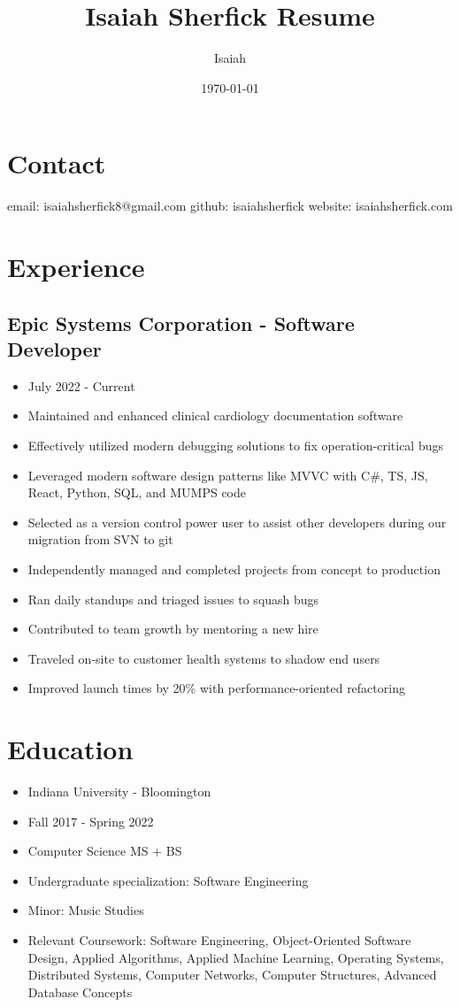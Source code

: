 \documentclass[11pt]{article}
\author{Isaiah}
\date{\today}
\title{Isaiah Sherfick Resume}
\begin{document}
\maketitle
\tableofcontents

\section{Contact}
\label{sec:org80c39f9}
email: isaiahsherfick8@gmail.com
github: isaiahsherfick
website: isaiahsherfick.com
\section{Experience}
\label{sec:org1af89ef}
\subsection{Epic Systems Corporation - Software Developer}
\label{sec:org43a5bc1}
\begin{itemize}
\item July 2022 - Current
\item Maintained and enhanced clinical cardiology documentation software
\item Effectively utilized modern debugging solutions to fix operation-critical bugs
\item Leveraged modern software design patterns like MVVC with C\#, TS, JS, React, Python, SQL, and MUMPS code
\item Selected as a version control power user to assist other developers during our migration from SVN to git
\item Independently managed and completed projects from concept to production
\item Ran daily standups and triaged issues to squash bugs
\item Contributed to team growth by mentoring a new hire
\item Traveled on-site to customer health systems to shadow end users
\item Improved launch times by 20\% with performance-oriented refactoring
\end{itemize}
\section{Education}
\label{sec:orga08435d}
\begin{itemize}
\item Indiana University - Bloomington
\item Fall 2017 - Spring 2022
\item Computer Science MS + BS
\item Undergraduate specialization: Software Engineering
\item Minor: Music Studies
\item Relevant Coursework: Software Engineering, Object-Oriented Software Design, Applied Algorithms, Applied Machine Learning, Operating Systems, Distributed Systems, Computer Networks, Computer Structures, Advanced Database Concepts
\end{itemize}
\end{document}
